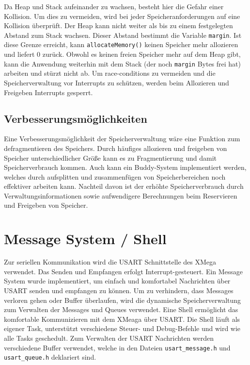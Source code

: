 \documentclass[fontsize=12pt, toc=bibliography, notitlepage]{scrreprt}
\begin{document}
Da Heap und Stack aufeinander zu wachsen, besteht hier die Gefahr einer Kollision. Um dies zu vermeiden, wird bei jeder Speicheranforderungen auf eine Kollision überprüft. Der Heap kann nicht weiter als bis zu einem festgelegten Abstand zum Stack wachsen. Dieser Abstand bestimmt die Variable \lstinline$margin$. Ist diese Grenze erreicht, kann \lstinline$allocateMemory()$ keinen Speicher mehr allozieren und liefert 0 zurück. Obwohl es keinen freien Speicher mehr auf dem Heap gibt, kann die Anwendung weiterhin mit dem Stack (der noch \lstinline$margin$ Bytes frei hat) arbeiten und stürzt nicht ab. Um race-conditions zu vermeiden und die Speicherverwaltung vor Interrupts zu schützen, werden beim Allozieren und Freigeben Interrupts gesperrt.

\section{Verbesserungsmöglichkeiten}
Eine Verbesserungsmöglichkeit der Speicherverwaltung wäre eine Funktion zum defragmentieren des Speichers. Durch häufiges allozieren und freigeben von Speicher unterschiedlicher Größe kann es zu Fragmentierung und damit Speicherverbrauch kommen. Auch kann ein Buddy-System implementiert werden, welches durch aufsplitten und zusammenfügen von Speicherbereichen noch effektiver arbeiten kann. Nachteil davon ist der erhöhte Speicherverbrauch durch Verwaltungsinformationen sowie aufwendigere Berechnungen beim Reservieren und Freigeben von Speicher.

\chapter{Message System / Shell}
\label{chap:die-shell}
Zur seriellen Kommunikation wird die USART Schnittstelle des XMega verwendet. Das Senden und Empfangen erfolgt Interrupt-gesteuert. Ein Message System wurde implementiert, um einfach und komfortabel Nachrichten über USART senden und empfangen zu können. Um zu verhindern, dass Messages verloren gehen oder Buffer überlaufen, wird die dynamische Speicherverwaltung zum Verwalten der Messages und Queues verwendet. Eine Shell ermöglicht das komfortable Kommunizieren mit dem XMeaga über USART. Die Shell läuft als eigener Task, unterstützt verschiedene Steuer- und Debug-Befehle und wird wie alle Tasks geschedult. Zum Verwalten der USART Nachrichten werden verschiedene Buffer verwendet, welche in den Dateien \lstinline$usart_message.h$ und \lstinline$usart_queue.h$ deklariert sind.
\end{document}
